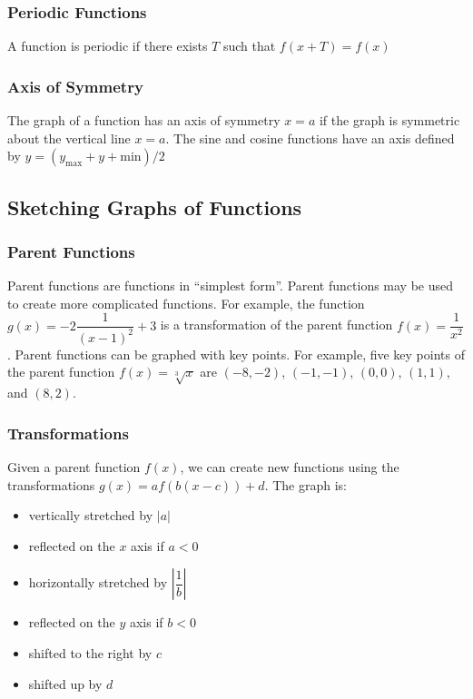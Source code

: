 \documentclass{article}
\begin{document}
	\subsubsection{Periodic Functions}
	A function is periodic if there exists $T$ such that $f(x+T)=f(x)$
	\subsubsection{Axis of Symmetry}
	The graph of a function has an axis of symmetry $x=a$ if the graph is symmetric about the vertical line $x=a$. The sine and cosine functions have an axis defined by $y=(y_{\text{max}}+y+{\text{min}})/2$
	\subsection{Sketching Graphs of Functions}
	\subsubsection{Parent Functions}
	Parent functions are functions in ``simplest form''. Parent functions may be used to create more complicated functions. For example, the function $g(x)=-2\dfrac{1}{(x-1)^2}+3$ is a transformation of the parent function $f(x)=\dfrac{1}{x^2}$. Parent functions can be graphed with key points. For example, five key points of the parent function $f(x)=\sqrt[3]{x}$ are $(-8, -2)$, $(-1, -1)$, $(0, 0)$, $(1, 1)$, and $(8, 2)$.
	\subsubsection{Transformations}
	Given a parent function $f(x)$, we can create new functions using the transformations $g(x)=af(b(x-c))+d$. The graph is:
	\begin{itemize}
		\item vertically stretched by $|a|$
		\item reflected on the $x$ axis if $a<0$
		\item horizontally stretched by $\left|\dfrac{1}{b}\right|$
		\item reflected on the $y$ axis if $b<0$
		\item shifted to the right by $c$
		\item shifted up by $d$
	\end{itemize}
\end{document}
